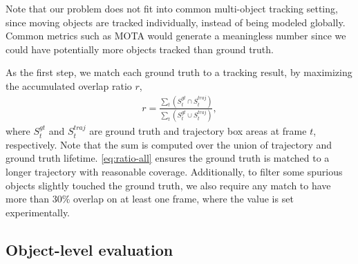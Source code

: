 Note that our problem does not fit into common multi-object tracking setting, since moving objects are tracked individually, instead of being modeled globally. Common metrics such as MOTA \cite{bernardin2008evaluating} would generate a meaningless number since we could have potentially more objects tracked than ground truth.

As the first step, we match each ground truth to a tracking result, by maximizing the accumulated overlap ratio $r$, 
\begin{align}
    r=\frac{\sum_t{(S_t^{gt}\cap S_t^{traj})}}{\sum_t{(S_t^{gt}\cup S_t^{traj})}},
    \label{eq:ratio-all}
\end{align}
where $S_t^{gt}$ and $S_t^{traj}$ are ground truth and trajectory box areas at frame $t$, respectively. Note that the sum is computed over the union of trajectory and ground truth lifetime. 
\ref{eq:ratio-all} ensures the ground truth is matched to a longer trajectory with reasonable coverage. 
Additionally, to filter some spurious objects slightly touched the ground truth, we also require any match to have more than $30\%$ overlap on at least one frame, where the value is set experimentally.


\subsection{Object-level evaluation} 
\label{subsec:tracker-eval-count}

